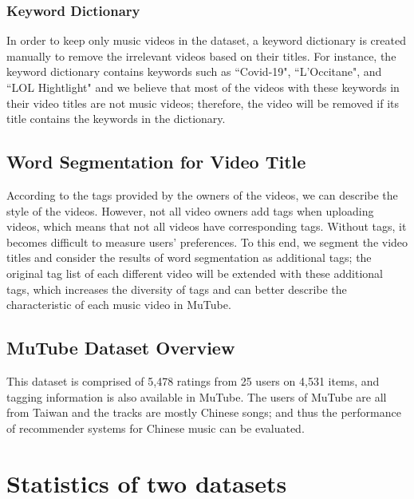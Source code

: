 \documentclass[a4paper,12pt]{report}
\begin{document}
\subsubsection{Keyword Dictionary}
In order to keep only music videos in the dataset, a keyword dictionary is created manually to remove the irrelevant videos based on their titles. For instance, the keyword dictionary contains keywords such as ``Covid-19", ``L'Occitane", and ``LOL Hightlight" and we believe that most of the videos with these keywords in their video titles are not music videos; therefore, the video will be removed if its title contains the keywords in the dictionary.
\subsection{Word Segmentation for Video Title}
According to the tags provided by the owners of the videos, we can describe the style of the videos. However, not all video owners add tags when uploading videos, which means that not all videos have corresponding tags. Without tags, it becomes difficult to measure users' preferences. To this end, we segment the video titles and consider the results of word segmentation as additional tags; the original tag list of each different video will be extended with these additional tags, which increases the diversity of tags and can better describe the characteristic of each music video in MuTube.
\subsection{MuTube Dataset Overview}
This dataset is comprised of 5,478 ratings from 25 users on 4,531 items, and tagging information is also available in MuTube. The users of MuTube are all from Taiwan and the tracks are mostly Chinese songs; and thus the performance of recommender systems for Chinese music can be evaluated. 

\section{Statistics of two datasets}
\end{document}
